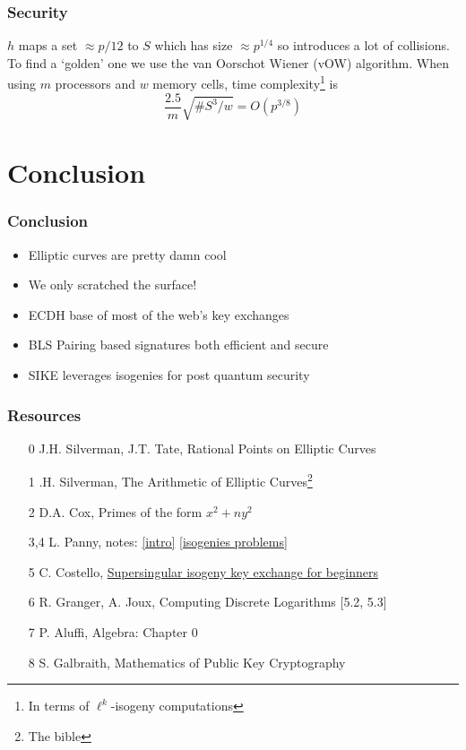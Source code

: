 \documentclass{beamer}
\begin{document}
\begin{frame}
    \frametitle{Security}
    $h$ maps a set $\approx p/12$ to $S$ which has size $\approx p^{1/4}$ so introduces a lot of collisions.
    To find a `golden' one we use the van Oorschot Wiener (vOW) algorithm. 
    When using $m$ processors and $w$ memory cells, time complexity\footnote{In terms of $\ell^k$-isogeny computations} is 
    \[ \frac{2.5}{m}\sqrt{\#S^3/w} = O(p^{3/8})  \]
\end{frame}

\section{Conclusion}
\begin{frame}
    \frametitle{Conclusion}
    \begin{itemize}
        \item Elliptic curves are pretty damn cool
        \item We only scratched the surface!
        \item ECDH base of most of the web's key exchanges
        \item BLS Pairing based signatures both efficient and secure
        \item SIKE leverages isogenies for post quantum security
    \end{itemize}
    

\end{frame}


\begin{frame}[noframenumbering]
    \frametitle{Resources}
    \begin{itemize}
        \item [0]  J.H. Silverman, J.T. Tate, Rational Points on Elliptic Curves 
        \item [1].H. Silverman, The Arithmetic of Elliptic Curves\footnote{The bible}
        \item [2] D.A. Cox, Primes of the form $x^2 + n y^2$
        \item [3,4] L. Panny, notes: \href{https://yx7.cc/docs/misc/isog_bristol_notes.pdf}{[intro]} \href{https://yx7.cc/docs/misc/isogprob_bristol_notes.pdf}{[isogenies problems]}
        \item [5]C. Costello, \href{https://eprint.iacr.org/2019/1321.pdf}{Supersingular isogeny key exchange for beginners}
        \item [6]R. Granger, A. Joux, Computing Discrete Logarithms [5.2, 5.3]
        \item [7]P. Aluffi, Algebra: Chapter 0
        \item [8]S. Galbraith, Mathematics of Public Key Cryptography
    \end{itemize}
\end{frame}
\end{document}
